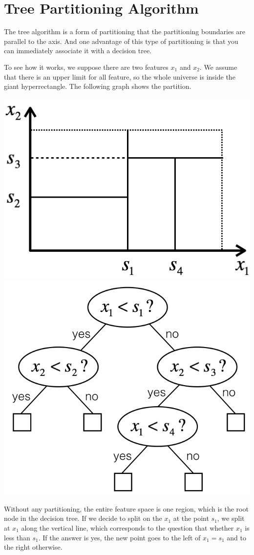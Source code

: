 \documentclass{article}
\begin{document}
\section{Tree Partitioning Algorithm}{
	 The tree algorithm is a form of partitioning that the partitioning boundaries are parallel to the axis. And one advantage of this type of partitioning is that you can immediately associate it with a decision tree.
	
	 To see how it works, we suppose there are two features $x_1$ and $x_2$. We assume that there is an upper limit for all feature, so the whole universe is inside the giant hyperrectangle. The following graph shows the partition.
	 \begin{center}
		 \includegraphics[scale=0.65]{images/Rectangle.png}
		 \includegraphics[scale=0.5]{images/DecisionTree.png}
	 \end{center}  
	 Without any partitioning, the entire feature space is one region, which is the root node in the decision tree. If we decide to split on the $x_1$ at the point $s_1$, we split at $x_1$ along the vertical line, which corresponds to the question that whether $x_1$ is less than $s_1$. If the answer is yes, the new point goes to the left of $x_1=s_1$ and to the right otherwise.
	 
}
\end{document}
